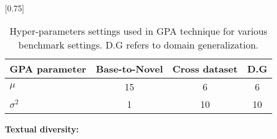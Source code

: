 \documentclass[10pt,twocolumn,letterpaper]{article}
\begin{document}
\begin{table}[!h]

    \small \centering
 \setlength{\tabcolsep}{8pt}
    \scalebox{0.75}[0.75]{
    \begin{tabular}{l ccc}
    \toprule
    GPA parameter & Base-to-Novel  & Cross dataset & D.G\\
    \midrule
$\mu$ & 15& 6 & 6 \\
$\sigma^{2}$ & 1 & 10  & 10\\
    \bottomrule
    \end{tabular}
    }\vspace{-0.5em}
    \caption{Hyper-parameters settings used in GPA technique for various benchmark settings. D.G refers to domain generalization.
    }
    \label{tab_appendix:GPA_hyper_parameters}
\end{table} 
\noindent \textbf{Textual diversity:}
\end{document}
